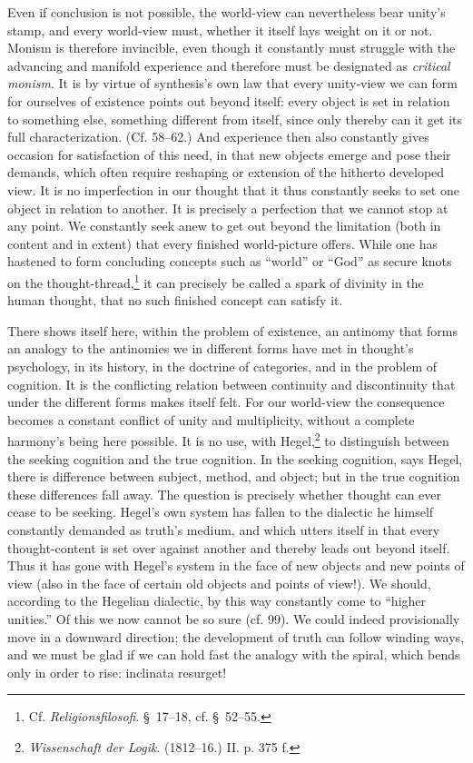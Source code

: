 \documentclass[12pt,a4paper]{book}
\newcommand{\opage}[1]{\marginnote{\footnotesize\textit{[#1]}}}
\begin{document}
Even if conclusion is not possible, the world-view can nevertheless bear unity's stamp, and every
world-view must, whether it itself lays weight on it or not. Monism is therefore invincible, even
though it constantly must \opage{322}struggle with the advancing and manifold experience and therefore must be
designated as \emph{critical monism}. It is by virtue of synthesis's own law that every unity-view we
can form for ourselves of existence points out beyond itself: every object is set in relation to
something else, something different from itself, since only thereby can it get its full
characterization. (Cf. 58--62.) And experience then also constantly gives occasion for satisfaction
of this need, in that new objects emerge and pose their demands, which often require reshaping or
extension of the hitherto developed view. It is no imperfection in our thought that it thus
constantly seeks to set one object in relation to another. It is precisely a perfection that we
cannot stop at any point. We constantly seek anew to get out beyond the limitation (both in content
and in extent) that every finished world-picture offers. While one has hastened to form concluding concepts such as ``world'' or ``God'' as secure knots on the thought-thread,\footnote{Cf. \emph{Religionsfilosofi}.
\S\ 17--18, cf. \S\ 52--55.} it can precisely be called a spark of divinity in the human thought,
that no such finished concept can satisfy it.

There shows itself here, within the problem of existence, an antinomy that forms an analogy to the
antinomies we in different forms have met in thought's psychology, in its history, in the doctrine of
categories, and in the problem of cognition. It is the conflicting relation between continuity and
discontinuity that under the different forms makes itself felt. For our world-view the consequence
becomes a constant conflict of unity and multiplicity, without a complete harmony's being here
possible. It is no use, with Hegel,\footnote{\emph{Wissenschaft der Logik}. (1812--16.) II. p. 375
f.} to distinguish between the seeking cognition and the true cognition. In the seeking cognition,
says Hegel, there is difference between subject, method, and object; but in the true cognition these
differences fall away. The question is precisely whether thought can ever cease to be seeking. Hegel's
own system has fallen to the dialectic he himself constantly demanded as \opage{323}truth's medium, and which
utters itself in that every thought-content is set over against another and thereby leads out beyond
itself. Thus it has gone with Hegel's system in the face of new objects and new points of view (also
in the face of certain old objects and points of view!). We should, according to the Hegelian
dialectic, by this way constantly come to ``higher unities.'' Of this we now cannot be so sure (cf.
99). We could indeed provisionally move in a downward direction; the development of truth can follow
winding ways, and we must be glad if we can hold fast the analogy with the spiral, which bends only in
order to rise: inclinata resurget!
\end{document}
